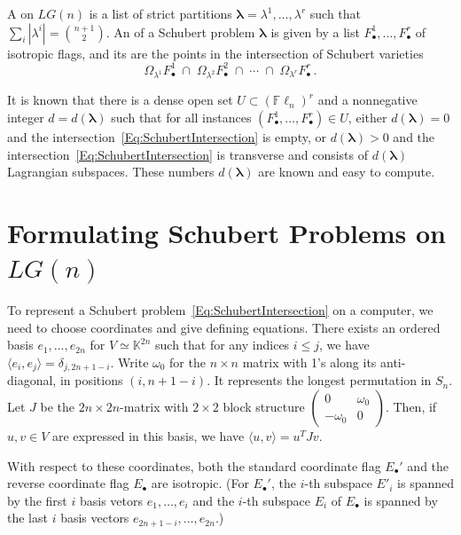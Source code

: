 \documentclass[12pt]{amsart}
\theoremstyle{remark}
\newcommand{\Fdot}{F_\bullet}
\newcommand{\Edot}{E_\bullet}
\newcommand{\LG}{\textit{LG}}
\newcommand{\Fln}{{\mathbb F}\ell_n}
\newcommand{\blambda}{\boldsymbol{\lambda}}
\newcommand{\KK}{{\mathbb K}}
\newcommand{\defcolor}[1]{{\color{blue}#1}}
\newcommand{\demph}[1]{\defcolor{{\sl #1}}}
\begin{document}
  
A \demph{Schubert problem} on $\LG(n)$ is a list of strict partitions
$\blambda = \lambda^1,\dotsc,\lambda^r$ such that $\sum_i|\lambda^i|=\binom{n+1}{2}$.
An \demph{instance} of a Schubert problem $\blambda$ is given by a list $\Fdot^1,\dotsc,\Fdot^r$ of isotropic flags, and
its \demph{solutions} are the points in the intersection of Schubert varieties
%
 \begin{equation}\label{Eq:SchubertIntersection}
   \Omega_{\lambda^1}\Fdot^1\; \cap\;
   \Omega_{\lambda^2}\Fdot^2\; \cap\; \dotsb
   \; \cap\; \Omega_{\lambda^r}\Fdot^r\,.
 \end{equation}
%   

It is known that there is a dense open set $U\subset(\Fln)^r$ and a nonnegative integer $d=d(\blambda)$ such that for all
instances $(\Fdot^1,\dotsc,\Fdot^r)\in U$, either $d(\blambda)=0$ and the intersection~\eqref{Eq:SchubertIntersection}
is empty, or $d(\blambda)>0$ and the intersection~\eqref{Eq:SchubertIntersection} is transverse and consists of
$d(\blambda)$ Lagrangian subspaces. 
These numbers $d(\blambda)$ are known and easy to compute.
 
\section{Formulating Schubert Problems on $LG(n)$}

To represent a Schubert problem~\eqref{Eq:SchubertIntersection} on a computer, we need to choose coordinates
and give defining equations.
There exists an ordered basis  $e_1,\dotsc,e_{2n}$ for $V\simeq\KK^{2n}$ such that for any indices  $i\leq j$, we have 
$\langle e_i,e_j\rangle = \delta_{j, 2n+1-i}$.
Write \defcolor{$\omega_0$} for the $n\times n$ matrix with 1's along its anti-diagonal, in positions $(i,n{+}1{-}i)$.
It represents the longest permutation in $S_n$.
Let $J$ be the $2n\times 2n$-matrix with $2\times 2$ block structure
$\left(\begin{smallmatrix}0&\omega_0\\-\omega_0&0\end{smallmatrix}\right)$.
Then, if $u,v\in V$ are expressed in this basis, we have $\langle u,v\rangle = u^T J v$.

With respect to these coordinates,  both the standard coordinate flag \defcolor{$\Edot'$} and the reverse
coordinate flag \defcolor{$\Edot$} are isotropic.
(For $\Edot'$, the $i$-th subspace $E'_i$ is spanned by the first $i$ basis vetors $e_1,\dotsc,e_i$ and
the  $i$-th subspace $E_i$ of $\Edot$ is spanned by the last $i$ basis vectors $e_{2n+1-i},\dotsc, e_{2n}$.)
\end{document}
